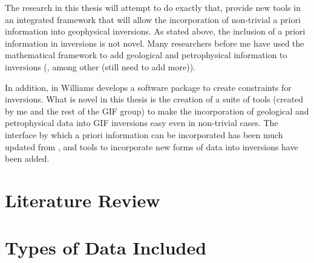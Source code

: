 The research in this thesis will attempt to do exactly that, provide new tools in an integrated framework that will allow the incorporation of non-trivial a priori information into geophysical inversions. As stated above, the inclusion of a priori information in inversions is not novel.  Many researchers before me have used the mathematical framework to add geological and petrophysical information to inversions (\cite{Lelievre2009Integrating},\cite{phillips2002geophysical} among other (still need to add more)). 

In addition, in \cite{williams2008geologically} Williams develops a software package to create constraints for inversions. What is novel in this thesis is the creation of a suite of tools (created by me and the rest of the \ac{GIF} group) to make the incorporation of geological and petrophysical data into \ac{GIF} inversions easy even in non-trivial cases. The interface by which a priori information can be incorporated has been much updated from \cite{williams2008geologically}, and tools to incorporate new forms of data into inversions have been added.



\section{Literature Review}
\label{sec:Literature Review}


\section{Types of Data Included}
\label{sec:Types of Data Included}

\endinput

 Interestingly, the assumption that all magnetizations are in the same direction also assumes that all Koenigsberger ratios are equal.

Any text after an \endinput is ignored.
You could put scraps here or things in progress.
